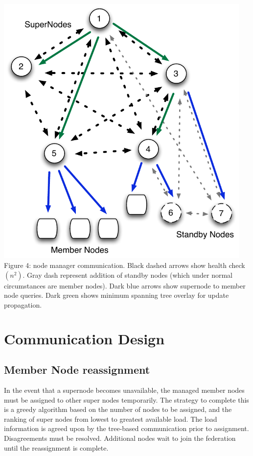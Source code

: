 \documentclass[oneside,12pt]{memoir}
\begin{document}
\begin{center}
\includegraphics[width=5in]{presentation/Node-comm-v3.pdf}\\
Figure 4: node manager communication.  Black dashed arrows show health check $(n^2)$.  Gray dash represent addition of standby nodes (which under normal circumstances are member nodes).  Dark blue arrows show supernode to member node queries.  Dark green shows minimum spanning tree overlay for update propagation.
\end{center}

\section{Communication Design}

\subsection{Member Node reassignment}

In the event that a supernode becomes unavailable, the managed member nodes must be assigned to other super nodes temporarily.  The strategy to complete this is a greedy algorithm based on the number of nodes to be assigned, and the ranking of super nodes from lowest to greatest available load.  The load information is agreed upon by the tree-based communication prior to assignment.  Disagreements must be resolved.  Additional nodes wait to join the federation until the reassignment is complete. 
\end{document}
